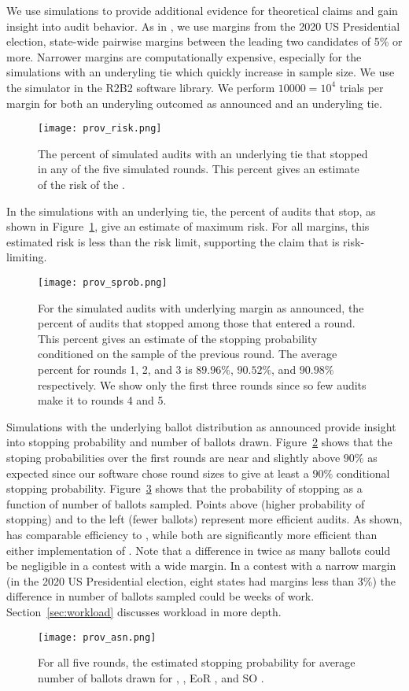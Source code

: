 We use simulations to provide additional evidence for theoretical claims and gain insight into audit behavior. As in \cite{sims}, we use margins from the 2020 US Presidential election, state-wide pairwise margins between the leading two candidates of 5\% or more. Narrower margins are computationally expensive, especially for the simulations with an underyling tie which quickly increase in sample size. We use the simulator in the R2B2 software library\cite{r2b2}. We perform $10000=10^4$ trials per margin for both an underyling outcomed as announced and an underyling tie.

\begin{figure}
\texttt{[image: prov\_risk.png]}
\caption{The percent of simulated audits \Providence with an underlying tie that stopped in any of the five simulated rounds. This percent gives an estimate of the risk of the \Providence.}
\label{fig:prov-risk}
\end{figure}

In the simulations with an underlying tie, the percent of audits that stop, as shown in Figure~\ref{fig:prov-risk}, give an estimate of maximum risk. For all margins, this estimated risk is less than the risk limit, supporting the claim that \Providence is risk-limiting.

\begin{figure}
\texttt{[image: prov\_sprob.png]}
\caption{For the simulated \Providence audits with underlying margin as announced, the percent of audits that stopped among those that entered a round. This percent gives an estimate of the stopping probability conditioned on the sample of the previous round. The average percent for rounds 1, 2, and 3 is $89.96\%$, $90.52\%$, and $90.98\%$ respectively. We show only the first three rounds since so few audits make it to rounds 4 and 5.}
\label{fig:prov-sprob}
\end{figure}

Simulations with the underlying ballot distribution as announced provide insight into stopping probability and number of ballots drawn. Figure~\ref{fig:prov-sprob} shows that the stoping probabilities over the first rounds are near and slightly above $90\%$ as expected since our software chose round sizes to give at least a $90\%$ conditional stopping probability.
Figure~\ref{fig:prov-asn} shows that the probability of stopping as a function of number of ballots sampled. Points above (higher probability of stopping) and to the left (fewer ballots) represent more efficient audits. As shown, \Providence has comparable efficiency to \Minerva, while both are significantly more efficient than either implementation of \BRAVO. Note that a difference in twice as many ballots could be negligible in a contest with a wide margin. In a contest with a narrow margin (in the 2020 US Presidential election, eight states had margins less than $3\%$) the difference in number of ballots sampled could be weeks of work. Section~\ref{sec:workload} discusses workload in more depth.

\begin{figure}
\texttt{[image: prov\_asn.png]}
\caption{For all five rounds, the estimated stopping probability for average number of ballots drawn for \Providence, \Minerva, EoR \BRAVO, and SO \BRAVO.}
\label{fig:prov-asn}
\end{figure}








